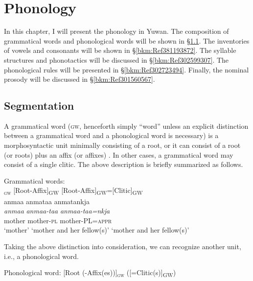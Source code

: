 \chapter{Phonology}\label{chap:2}
\hypertarget{RefHeadingToc395696960}{}
In this chapter, I will present the phonology in Yuwan. The composition of grammatical words and phonological words will be shown in §\ref{bkm:Ref381193780}. The inventories of vowels and consonants will be shown in §\ref{bkm:Ref381193872}. The syllable structures and phonotactics will be discussed in §\ref{bkm:Ref302599307}. The phonological rules will be presented in §\ref{bkm:Ref302723494}. Finally, the nominal prosody will be discussed in §\ref{bkm:Ref301560567}.

\section{Segmentation}
\label{bkm:Ref381193780}\hypertarget{RefHeadingToc395696961}{}\label{bkm:Ref347179371}
A grammatical word (\textsc{gw}, henceforth simply “word” unless an explicit distinction between a grammatical word and a phonological word is necessary) is a morphosyntactic unit minimally consisting of a root, or it can consist of a root (or roots) plus an affix (or affixes) \citep[cf.][]{DixonAikhenvald2002}. In other cases, a grammatical word may consist of a single clitic. The above description is briefly summarized as follows.

\ea Grammatical words: \\\glllll\relax
[Root]\textsubscript{\textsc{gw}} [Root-Affix]\textsubscript{GW} [Root-Affix]\textsubscript{GW}=[Clitic]\textsubscript{GW}\\
anmaa anmataa anmatankja\footnotemark{}\\
{\itshape anmaa} {\itshape anmaa-taa} {\itshape anmaa-taa=nkja}\\
mother mother-\textsc{pl} mother-PL=\textsc{appr}\\
‘mother’ {‘mother and her fellow(s)’} {‘mother and her fellow(s)’}\\
\z
{}

\noindent Taking the above distinction into consideration, we can recognize another unit, i.e., a phonological word.

\ea Phonological word: [Root (-Affix(es))]\textsubscript{\textsc{gw}} ([=Clitic(s)]\textsubscript{GW}) \z


